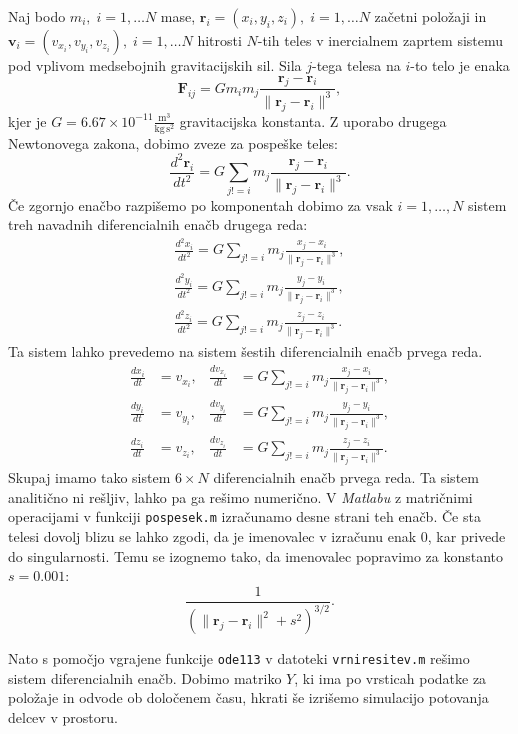 \documentclass[a4paper,12pt]{article}
\begin{document}
Naj bodo $m_i,\; i=1,\dots N$ mase, $\mathbf{r}_i = (x_i, y_i, z_i),\; i=1,\dots N$ začetni položaji
in $\mathbf{v}_i = (v_{x_i}, v_{y_i}, v_{z_i}),\; i=1,\dots N$ hitrosti $N$-tih teles v inercialnem zaprtem sistemu
pod vplivom medsebojnih gravitacijskih sil. 
Sila $j$-tega telesa na $i$-to telo je enaka
\[
    \mathbf{F}_{ij} = Gm_im_j \frac{\mathbf{r}_j-\mathbf{r}_i}{\lVert \mathbf{r}_j - \mathbf{r}_i \rVert^3},\]
kjer je $G = 6.67 \times 10^{-11} \frac{\text{m}^3}{\text{kg} \, \text{s}^2}$
gravitacijska konstanta.
Z uporabo drugega Newtonovega zakona, dobimo zveze za pospeške teles:
\[
    \frac{d^2\mathbf{r}_i}{dt^2} = G \sum_{j!=i}m_j\frac{\mathbf{r}_j-\mathbf{r}_i}{\lVert \mathbf{r}_j - \mathbf{r}_i \rVert^3}.\]
Če zgornjo enačbo razpišemo po komponentah dobimo za vsak $i=1, \dots, N$ sistem 
treh navadnih diferencialnih enačb drugega reda:
\begin{align*}
    \frac{d^2x_i}{dt^2} = G \sum_{j!=i}m_j\frac{x_j-x_i}{\lVert \mathbf{r}_j - \mathbf{r}_i \rVert^3}, \\
    \frac{d^2y_i}{dt^2} = G \sum_{j!=i}m_j\frac{y_j-y_i}{\lVert \mathbf{r}_j - \mathbf{r}_i \rVert^3}, \\
    \frac{d^2z_i}{dt^2} = G \sum_{j!=i}m_j\frac{z_j-z_i}{\lVert \mathbf{r}_j - \mathbf{r}_i \rVert^3}.
\end{align*}
Ta sistem lahko prevedemo na sistem šestih diferencialnih enačb prvega reda.
\begin{align*}
    \frac{dx_i}{dt} &= v_{x_i}, & \frac{dv_{x_i}}{dt} &= G \sum_{j!=i}m_j\frac{x_j-x_i}{\lVert \mathbf{r}_j - \mathbf{r}_i \rVert^3}, \\
    \frac{dy_i}{dt} &= v_{y_i}, & \frac{dv_{y_i}}{dt} &= G \sum_{j!=i}m_j\frac{y_j-y_i}{\lVert \mathbf{r}_j - \mathbf{r}_i \rVert^3}, \\
    \frac{dz_i}{dt} &= v_{z_i}, & \frac{dv_{z_i}}{dt} &= G \sum_{j!=i}m_j\frac{z_j-z_i}{\lVert \mathbf{r}_j - \mathbf{r}_i \rVert^3}. 
\end{align*}
Skupaj imamo tako sistem $6 \times N$ diferencialnih enačb prvega reda.
Ta sistem analitično ni rešljiv, lahko pa ga rešimo numerično.
V \textit{Matlabu} z matričnimi operacijami v funkciji \texttt{pospesek.m}
izračunamo desne strani teh enačb.
Če sta telesi dovolj blizu se lahko zgodi, da je imenovalec v izračunu enak $0$,
kar privede do singularnosti. Temu se izognemo tako, da imenovalec popravimo za konstanto $s = 0.001$:
\[
    \frac{1}{(\lVert \mathbf{r}_j - \mathbf{r}_i \rVert^2 + s^2)^{3/2}}.\]

Nato s pomočjo vgrajene funkcije \texttt{ode113} v datoteki 
\texttt{vrni\textunderscore resitev.m} rešimo sistem diferencialnih enačb.
Dobimo matriko $Y$, ki ima po vrsticah podatke za položaje in odvode ob določenem času, hkrati še izrišemo
simulacijo potovanja delcev v prostoru.
\end{document}
